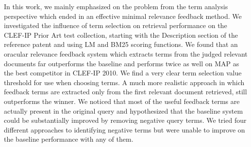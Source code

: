 In this work, we mainly emphasized on the problem from the term analysis perspective which ended in an effective minimal relevance feedback method. We investigated the influence of term selection on retrieval performance on the CLEF-IP Prior Art test collection, starting with the Description section of the reference patent and using LM and BM25 scoring functions. We found that an oracular relevance feedback system which extracts terms from the judged relevant documents far outperforms the baseline and  performs twice as well on MAP as the best competitor in CLEF-IP 2010.  We find a very clear term selection value threshold for use when choosing terms.  A much more realistic approach in which feedback terms are extracted only from the first relevant document retrieved, still outperforms the winner.   We noticed that most of the useful feedback terms are actually present in the original query and hypothesized that the baseline system could be substantially improved by removing negative query terms.  We tried four different approaches to identifying negative terms but were unable to improve on the baseline performance with any of them.
